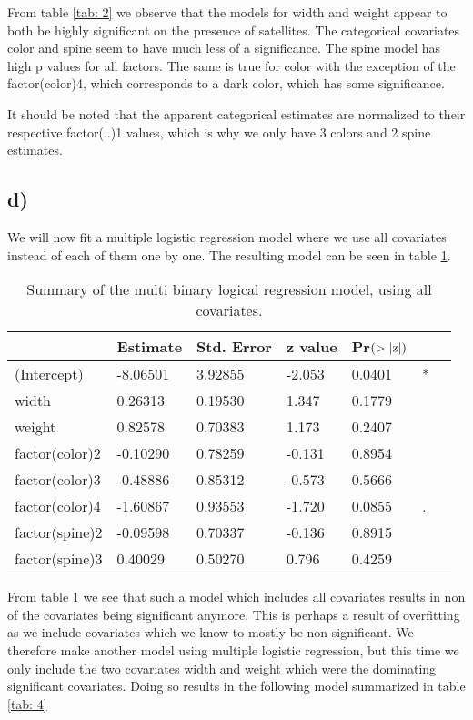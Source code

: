 \documentclass[a4paper, 10pt, reqno]{amsart}
\begin{document}
From table \ref{tab: 2} we observe that the models for width and weight appear to both be highly significant on the presence of satellites. The categorical covariates color and spine seem to have much less of a significance. The spine model has high p values for all factors. The same is true for color with the exception of the factor(color)4, which corresponds to a dark color, which has some significance.

It should be noted that the apparent categorical estimates are normalized to their respective factor(..)1 values, which is why we only have 3 colors and 2 spine estimates.

\subsection{d)}
We will now fit a multiple logistic regression model where we use all covariates instead of each of them one by one. The resulting model can be seen in table \ref{tab: 3}.


\begin{table}
\caption{Summary of the multi binary logical regression model, using all covariates.}
\label{tab: 3}
\begin{tabular}{lllllll}
\hline\hline
 & Estimate  & Std. Error & z value & Pr$(>\abs{\mathrm{z}})$ & \\ \hline
(Intercept)  &  -8.06501 &   3.92855 & -2.053  & 0.0401& *\\
width&           0.26313&    0.19530&   1.347&   0.1779&  \\
weight   &       0.82578  &  0.70383 &  1.173  & 0.2407 & \\
factor(color)2& -0.10290  &  0.78259 & -0.131 &  0.8954 & \\
factor(color)3& -0.48886  &  0.85312&  -0.573  & 0.5666 & \\
factor(color)4& -1.60867  &  0.93553&  -1.720  & 0.0855 &.\\
factor(spine)2& -0.09598  &  0.70337 & -0.136  & 0.8915 & \\
factor(spine)3 & 0.40029   & 0.50270 &  0.796  & 0.4259 & \\
\hline
\end{tabular}
\end{table}

From table \ref{tab: 3} we see that such a model which includes all covariates results in non of the covariates being significant anymore. This is perhaps a result of overfitting as we include covariates which we know to mostly be non-significant. We therefore make another model using multiple logistic regression, but this time we only include the two covariates width and weight which were the dominating significant covariates. Doing so results in the following model summarized in table \ref{tab: 4}
\end{document}

